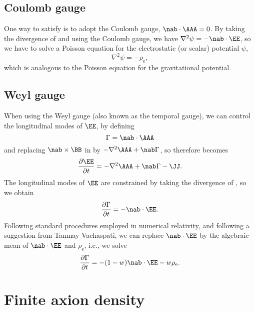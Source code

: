 \documentclass{article}
\begin{document}
\subsection{Coulomb gauge}

One way to satisfy  is to adopt the Coulomb
gauge, $\nab\cdot\AAA=0$.
By taking the divergence of  and using the Coulomb gauge, we have
$\nabla^2\psi=-\nab\cdot\EE$, so we have to solve a Poisson equation
for the electrostatic (or scalar) potential $\psi$,
\begin{equation}
\nabla^2\psi=-\rho_\mathrm{e},
\end{equation}
which is analogous to the Poisson equation for the gravitational potential.

\subsection{Weyl gauge}

When using the Weyl gauge (also known as the temporal gauge),
we can control the longitudinal modes of $\EE$, by defining
\begin{equation}
\Gamma=\nab\cdot\AAA
\end{equation}
and replacing $\nab\times\BB$ in  by $-\nabla^2\AAA+\nab\Gamma$,
so therefore  becomes
\begin{equation}
\frac{\partial\EE}{\partial t}=-\nabla^2\AAA+\nab \Gamma-\JJ.
\label{dE2dt}
\end{equation}
The longitudinal modes of $\EE$ are constrained by
taking the divergence of , so we obtain
\begin{equation}
\frac{\partial\Gamma}{\partial t}=-\nab\cdot\EE.
\label{dGdt}
\end{equation}
Following standard procedures employed in numerical relativity,
and following a suggestion from Tanmay Vachaspati, we can
replace $\nab\cdot\EE$ by the algebraic mean of $\nab\cdot\EE$ and
$\rho_\mathrm{e}$, i.e., we solve
\begin{equation}
\frac{\partial\Gamma}{\partial t}=-(1-w)\nab\cdot\EE
-w\rho_\mathrm{e}.
\label{dG2dt}
\end{equation}

\section{Finite axion density}
\end{document}
